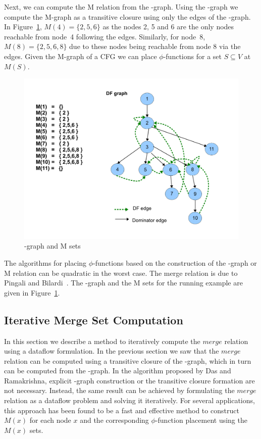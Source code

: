 {Next, we can compute the M relation from the \DF-graph. 
Using the \DF-graph we compute the M-graph as a transitive closure
using only the \DF edges of the \DJ-graph. In Figure~\ref{fig:mgraph}, $M(4) = 
\{2,5,6\}$ as the nodes 2, 5 and 6 are the only nodes reachable from node~4 
following the \DF edges. Similarly, for node~8, $M(8) = \{2,5,6,8\}$ due to these nodes being reachable from node 8 via the \DF edges. Given the M-graph of a CFG we can place $\phi$-functions for a set $S \subseteq V$ at $M(S)$.

    \begin{figure}[htb]
    \centerline{\includegraphics[scale=0.4]{mgraph_1.pdf}}
    \caption{\DF-graph and M sets}
    \label{fig:mgraph}
    \end{figure} 

The algorithms for placing $\phi$-functions based on the construction of the 
\DF-graph or M relation can be quadratic in the worst case. The merge relation 
is due to Pingali and Bilardi~\cite{bilardi}. The \DF-graph and the M sets for the running 
example are given in Figure~\ref{fig:mgraph}.

\subsection{Iterative Merge Set Computation}
In this section we describe a method to iteratively compute the 
$\textit{merge}$ relation using a dataflow formulation. In the previous section 
we saw that the $\textit{merge}$ relation can be computed using a transitive 
closure of the \DF-graph, which in turn can be computed from the \DJ-graph. In 
the algorithm proposed by Das and Ramakrishna, explicit \DF-graph construction 
or the transitive closure formation are not necessary. Instead, the same result 
can be achieved by formulating the $\textit{merge}$ relation as a dataflow 
problem and solving it iteratively. For several applications, this approach has 
been found to be a fast and effective method to construct $M(x)$ for each node 
$x$ and the corresponding $\phi$-function placement using the $M(x)$ sets. 

}
